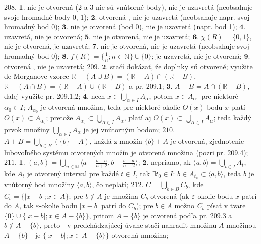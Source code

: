 $\boxed{208.}$  $\boldsymbol{1.}$ nie je otvorená (2 a 3 nie sú vnútorné body), nie je uzavretá (neobsahuje svoje hromadné body 0, 1);
$\boldsymbol{2.}$ otvorená , nie je uzavretá (neobsahuje napr. svoj hromadný bod 0);
$\boldsymbol{3.}$ nie je otvorená (bod 0),  nie je uzavretá (napr.  bod 1);
$\boldsymbol{4.}$ uzavretá, nie je otvorená;
$\boldsymbol{5.}$  nie je otvorená, nie je uzavretá;
$\boldsymbol{6.}$  $\chi (R)=\lbrace 0,1\rbrace $,  nie je otvorená, je uzavretá;
$\boldsymbol{7.}$ nie je otvorená,  nie je uzavretá (neobsahuje svoj hromadný bod 0);
$\boldsymbol{8.}$ $f(R)=\lbrace \frac{1}{n}; n \in \mathbb{N} \rbrace  \cup \lbrace 0 \rbrace$; je  uzavretá, nie je otvorená;
$\boldsymbol{9.}$  otvorená , nie je uzavretá;
$\boxed{209.}$  $\boldsymbol{2.}$ stačí dokázať, že doplnky sú otvorené; využite de Morganove vzorce $\mathbb{R}-(A \cup B)= (\mathbb{R} - A) \cap ( \mathbb{R} - B) $, $\mathbb{R}-(A \cap B)= (\mathbb{R} - A) \cup ( \mathbb{R} - B) $ a pr. 209.1;
$\boldsymbol{3.}$ $ A-B=A \cap (\mathbb{R} - B)$, ďalej využite pr. 209.1,2;
$\boldsymbol{4.}$ nech $x \in \bigcup\limits_{\alpha \in I }A_{\alpha} $, potom  $x \in A_{\alpha_{0}}  $ pre  niektoré $\alpha_{0}\in I $; $ A_{\alpha_{0}} $ je otvorená množina, teda pre niektoré okolie $O(x)$ bodu $x$ platí $O(x) \subset A_{\alpha_{0}}$; pretože $A_{\alpha_{0}}\subset \bigcup\limits_{\alpha \in I}A_{\alpha} $, platí aj $O(x) \subset \bigcup\limits_{\alpha \in I}A_{\alpha}$; teda každý prvok množiny $\bigcup\limits_{\alpha \in I}A_{\alpha}$ je jej vnútorným bodom;
$\boxed{210.}$ $A+B=\bigcup\limits_{b \in B} ( \lbrace b \rbrace + A)$, každá z množín $\lbrace b \rbrace +A $ je otvorená, zjednotenie ľubovoľného systému otvorených množín je otvorená množina (pozri pr. 209.4);
$\boxed{211.}$ $\boldsymbol{1.}$ $(a,b)=\bigcup\limits_{n \in \mathbb{N}} \langle a+ \frac{b-a}{n+2}, b-\frac{b-a}{n+2} \rangle $;
$\boldsymbol{2.}$ nepriamo, ak $\langle a,b \rangle =\bigcup\limits_{t \in I}A_{t} $, kde $ A_{t} $ je otvorený interval pre každé $t \in I $, tak $\exists t_{0} \in I: \, b \in A_{t_{0}} \subset \langle a,b \rangle$, teda $b$ je vnútorný bod množiny $\langle a,b \rangle$, čo neplatí;
$\boxed{212.}$ $C =\bigcup\limits_{b \in B}C_{b} $, kde $C_{b}= \lbrace \vert x-b \vert; x \in A \rbrace $; pre $b \notin A $  je množina $ C_{b}$ otvorená (ak $ \varepsilon  $-okolie bodu  $x$ patrí do $A$, tak $ \varepsilon  $-okolie bodu $\vert x-b \vert $ patrí do $ C_{b}$); pre $b \in A $ možno $ C_{b}$ písať v tvare $\lbrace 0 \rbrace \cup \lbrace \vert x-b \vert ; x \in A- \lbrace b \rbrace \rbrace $, pritom $A-\lbrace b\rbrace  $ je otvorená podľa pr. 209.3 a $b \notin A-\lbrace b \rbrace $, preto - v predchádzajúcej úvahe stačí nahradiť množinu $A$   množinou $  A- \lbrace b \rbrace $  - je $\lbrace \vert x-b \vert; x \in A - \lbrace b \rbrace  \rbrace$ otvorená množina;
